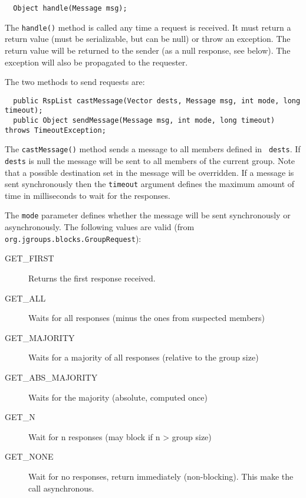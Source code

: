   \begin{small}
  \begin{verbatim}
  Object handle(Message msg);
  \end{verbatim}
  \end{small}

  The {\tt handle()} method is called any time a request is received. It must return
  a return value (must be serializable, but can be null) or throw an exception. The
  return value will be returned to the sender (as a null response, see below). The
  exception will also be propagated to the requester.

  The two methods to send requests are:

  \begin{small}
  \begin{verbatim}
  public RspList castMessage(Vector dests, Message msg, int mode, long timeout);
  public Object sendMessage(Message msg, int mode, long timeout) throws TimeoutException;
  \end{verbatim}
  \end{small}

  The {\tt castMessage()} method sends a message to all members defined in {\tt
  dests}. If {\tt dests} is null the message will be sent to all members of the
  current group. Note that a possible destination set in the message will be
  overridden. If a message is sent synchronously then the {\tt timeout} argument
  defines the maximum amount of time in milliseconds to wait for the responses.

  The {\tt mode} parameter defines whether the message will be sent synchronously or
  asynchronously. The following values are valid (from {\tt org.jgroups.blocks.GroupRequest}):

  \begin{description}
  \item[GET\_FIRST] Returns the first response received.
  \item[GET\_ALL] Waits for all responses (minus the ones from suspected members)
  \item[GET\_MAJORITY] Waits for a majority of all responses (relative to the group size)
  \item[GET\_ABS\_MAJORITY] Waits for the majority (absolute, computed once)
  \item[GET\_N] Wait for n responses (may block if n > group size)
  \item[GET\_NONE] Wait for no responses, return immediately (non-blocking). This
                   make the call asynchronous.
  \end{description}

